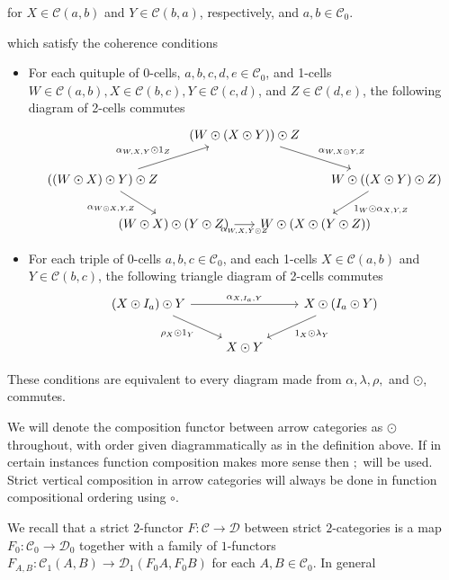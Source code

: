 \begin{defn}{}
\begin{itemize}
        for $X \in \mathcal{C}(a,b)$ and $Y \in \mathcal{C}(b,a)$, respectively, and $a,b \in \mathcal{C}_0$.
    \end{itemize}
    which satisfy the coherence conditions
    \begin{itemize}
        \item For each quituple of $0$-cells, $a,b,c,d,e \in \mathcal{C}_0$, and 1-cells $W \in \mathcal{C}(a,b), X \in \mathcal{C}(b,c), Y \in \mathcal{C}(c,d)$, and $Z \in \mathcal{C}(d,e)$, the following diagram of 2-cells commutes
        \[\begin{tikzcd}[column sep = -40pt]
        	&& {(W\odot (X\odot Y))\odot Z} \\
        	{((W\odot X)\odot Y)\odot Z} &&&& {W\odot ((X\odot Y)\odot Z)} \\
        	& {(W\odot X)\odot (Y\odot Z)} && {W\odot (X\odot (Y\odot Z))}
        	\arrow["{\alpha_{W,X,Y}\odot1_Z}", from=2-1, to=1-3]
        	\arrow["{\alpha_{W\odot X,Y,Z}}"', from=2-1, to=3-2]
        	\arrow["{\alpha_{W,X,Y\odot Z}}"', from=3-2, to=3-4]
        	\arrow["{\alpha_{W,X\odot Y,Z}}", from=1-3, to=2-5]
        	\arrow["{1_W\odot \alpha_{X,Y,Z}}", from=2-5, to=3-4]
        \end{tikzcd}\]
        \item For each triple of 0-cells $a,b,c \in \mathcal{C}_0$, and each 1-cells $X \in \mathcal{C}(a,b)$ and $Y \in \mathcal{C}(b,c)$, the following triangle diagram of 2-cells commutes
        \[\begin{tikzcd}
        	{(X\odot I_a)\odot Y} && {X\odot (I_a\odot Y)} \\
        	& {X\odot Y}
        	\arrow["{\alpha_{X,I_a,Y}}", from=1-1, to=1-3]
        	\arrow["{\rho_X\odot 1_Y}"', from=1-1, to=2-2]
        	\arrow["{1_X\odot\lambda_Y}", from=1-3, to=2-2]
        \end{tikzcd}\]
    \end{itemize}
    These conditions are equivalent to every diagram made from $\alpha, \lambda,\rho,$ and $\odot$, commutes.
\end{defn}

We will denote the composition functor between arrow categories as $\odot$ throughout, with order given diagrammatically as in the definition above. If in certain instances function composition makes more sense then $;$ will be used. Strict vertical composition in arrow categories will always be done in function compositional ordering using $\circ$.

We recall that a strict $2$-functor $F:\mathcal{C}\rightarrow \mathcal{D}$ between strict $2$-categories is a map $F_0:\mathcal{C}_0\rightarrow \mathcal{D}_0$ together with a family of $1$-functors $F_{A,B}:\mathcal{C}_1(A,B)\rightarrow \mathcal{D}_1(F_0A,F_0B)$ for each $A,B \in \mathcal{C}_0$. In general 

